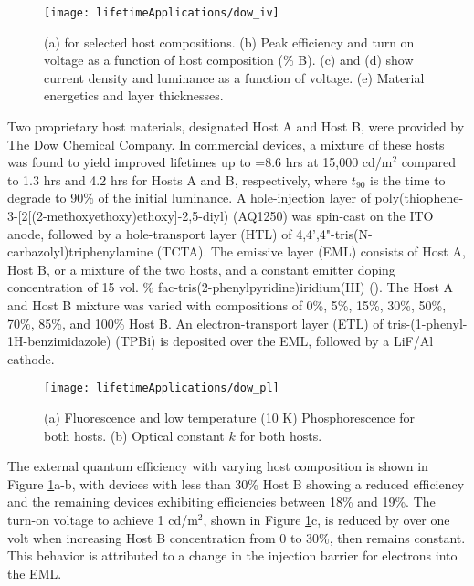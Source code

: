 \documentclass[../thesis.tex]{subfiles}
\begin{document}
\begin{figure}[ht]
\centering
\texttt{[image: lifetimeApplications/dow\_iv]}
\caption{(a) \eqe for selected host compositions. (b) Peak efficiency and turn on voltage as a function of host composition (\% B). (c) and (d) show current density and luminance as a function of voltage. (e) Material energetics and layer thicknesses.}
\label{fig:dow_iv}
\end{figure}

Two proprietary host materials, designated Host A and Host B, were provided by The Dow Chemical Company. 
In commercial devices, a mixture of these hosts was found to yield improved lifetimes up to =8.6 hrs at 15,000 cd/m$^2$ compared to 1.3 hrs and 4.2 hrs for Hosts A and B, respectively, where $t_{90}$ is the time to degrade to 90\% of the initial luminance. 
A hole-injection layer of poly(thiophene-3-[2[(2-methoxyethoxy)ethoxy]-2,5-diyl) (AQ1250) was spin-cast on the ITO anode, followed by a hole-transport layer (HTL) of 4,4',4"-tris(N-carbazolyl)triphenylamine (TCTA). 
The emissive layer (EML) consists of Host A, Host B, or a mixture of the two hosts, and a constant emitter doping concentration of 15 vol. \% fac-tris(2-phenylpyridine)iridium(III) (\irppy). 
The Host A and Host B mixture was varied with compositions of 0\%, 5\%, 15\%, 30\%, 50\%, 70\%, 85\%, and 100\% Host B. 
An electron-transport layer (ETL) of tris-(1-phenyl-1H-benzimidazole) (TPBi) is deposited over the EML, followed by a LiF/Al cathode. 

\begin{wrapfigure}{r}{.6\textwidth}
\centering
\texttt{[image: lifetimeApplications/dow\_pl]}
\caption{(a) Fluorescence and low temperature (10 K) Phosphorescence for both hosts. (b) Optical constant $k$ for both hosts.}
\label{fig:dow_pl}
\end{wrapfigure}
The external quantum efficiency with varying host composition is shown in Figure \ref{fig:dow_iv}a-b, with devices with less than 30\% Host B showing a reduced efficiency and the remaining devices exhibiting efficiencies between 18\% and 19\%. The turn-on voltage to achieve 1 cd/m$^2$, shown in Figure \ref{fig:dow_iv}c, is reduced by over one volt when increasing Host B concentration from 0 to 30\%, then remains constant. 
This behavior is attributed to a change in the injection barrier for electrons into the EML. 
\end{document}
